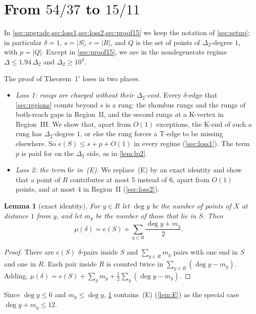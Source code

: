 \documentclass[11pt]{amsart}
\newtheorem{lemma}[theorem]{Lemma}
\theoremstyle{definition}
\theoremstyle{remark}
\newcommand{\Dt}{\Delta_2}
\newcommand{\mult}{\mu}
\begin{document}
\section{From \texorpdfstring{$54/37$}{54/37} to \texorpdfstring{$15/11$}{15/11}}\label{sec:upgrade}

In \cref{sec:upgrade,sec:loss1,sec:loss2,sec:proof15} we keep the notation of \cref{sec:setup}; in particular $\delta=1$, $s=|S|$, $r=|R|$, and $Q$ is the set of points of $\Dt$-degree $1$, with $p=|Q|$. Except in \cref{sec:proof15}, we are in the nondegenerate regime $\Delta\le1.94\,\Dt$ and $\Dt\ge10^4$.

The proof of Theorem~1$'$ loses in two places.
\begin{itemize}[leftmargin=2em]
\item \emph{Loss 1: rungs are charged without their $\Dt$-cost.} Every $\delta$-edge that \cref{sec:regions} counts beyond $s$ is a rung: the rhombus rungs and the rungs of both-reach gaps in Region~II, and the second rungs at a K-vertex in Region~III. We show that, apart from $O(1)$ exceptions, the K-end of such a rung has $\Dt$-degree $1$, or else the rung forces a T-edge to be missing elsewhere. So $e(S)\le s+p+O(1)$ in every regime (\cref{sec:loss1}). The term $p$ is paid for on the $\Dt$ side, as in \cref{lem:lp2}.
\item \emph{Loss 2: the term $6r$ in~(E).} We replace~(E) by an exact identity and show that a point of $R$ contributes at most $5$ instead of $6$, apart from $O(1)$ points, and at most $4$ in Region~II (\cref{sec:loss2}).
\end{itemize}

\begin{lemma}[exact identity]\label{lem:identity}
For $y\in R$ let $\deg y$ be the number of points of $X$ at distance $1$ from $y$, and let $m_y$ be the number of those that lie in $S$. Then
\[
\mult(\delta)=e(S)+\sum_{y\in R}\frac{\deg y+m_y}{2}.
\]
\end{lemma}
\begin{proof}
There are $e(S)$ $\delta$-pairs inside $S$ and $\sum_{y\in R}m_y$ pairs with one end in $S$ and one in $R$. Each pair inside $R$ is counted twice in $\sum_{y\in R}(\deg y-m_y)$. Adding, $\mult(\delta)=e(S)+\sum_y m_y+\frac12\sum_y(\deg y-m_y)$.
\end{proof}
Since $\deg y\le6$ and $m_y\le\deg y$, \cref{lem:identity} contains~(E) (\cref{lem:E}) as the special case $\deg y+m_y\le12$.
\end{document}
